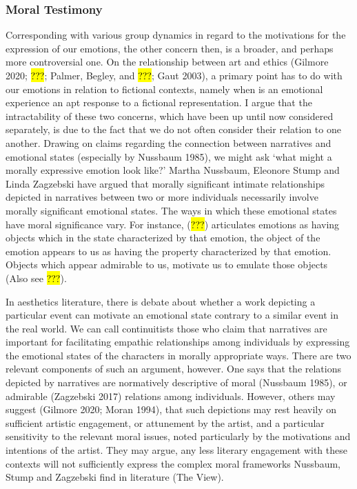 \documentclass[
  letterpaper,
  DIV=11,
  numbers=noendperiod]{scrartcl}
\theoremstyle{remark}
\begin{document}
\subsubsection{Moral Testimony}\label{moral-testimony}

Corresponding with various group dynamics in regard to the motivations
for the expression of our emotions, the other concern then, is a
broader, and perhaps more controversial one. On the relationship between
art and ethics (Gilmore 2020; \hl{???}; Palmer, Begley, and \hl{???};
Gaut 2003), a primary point has to do with our emotions in relation to
fictional contexts, namely when is an emotional experience an apt
response to a fictional representation. I argue that the intractability
of these two concerns, which have been up until now considered
separately, is due to the fact that we do not often consider their
relation to one another. Drawing on claims regarding the connection
between narratives and emotional states (especially by Nussbaum 1985),
we might ask `what might a morally expressive emotion look like?' Martha
Nussbaum, Eleonore Stump and Linda Zagzebski have argued that morally
significant intimate relationships depicted in narratives between two or
more individuals necessarily involve morally significant emotional
states. The ways in which these emotional states have moral significance
vary. For instance, (\hl{???}) articulates emotions as having objects
which in the state characterized by that emotion, the object of the
emotion appears to us as having the property characterized by that
emotion. Objects which appear admirable to us, motivate us to emulate
those objects (Also see \hl{???}).

In aesthetics literature, there is debate about whether a work depicting
a particular event can motivate an emotional state contrary to a similar
event in the real world. We can call continuitists those who claim that
narratives are important for facilitating empathic relationships among
individuals by expressing the emotional states of the characters in
morally appropriate ways. There are two relevant components of such an
argument, however. One says that the relations depicted by narratives
are normatively descriptive of moral (Nussbaum 1985), or admirable
(Zagzebski 2017) relations among individuals. However, others may
suggest (Gilmore 2020; Moran 1994), that such depictions may rest
heavily on sufficient artistic engagement, or attunement by the artist,
and a particular sensitivity to the relevant moral issues, noted
particularly by the motivations and intentions of the artist. They may
argue, any less literary engagement with these contexts will not
sufficiently express the complex moral frameworks Nussbaum, Stump and
Zagzebski find in literature (The View).
\end{document}
